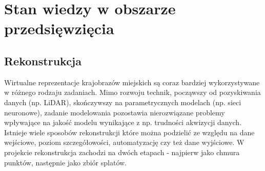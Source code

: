 \section{Stan wiedzy w obszarze przedsięwzięcia}



\subsection{Rekonstrukcja}

Wirtualne reprezentacje krajobrazów miejskich są coraz bardziej wykorzystywane w różnego rodzaju zadaniach. Mimo rozwoju technik, począwszy od pozyskiwania danych (np. LiDAR), skończywszy na parametrycznych modelach (np. sieci neuronowe), zadanie modelowania pozostawia nierozwiązane problemy wpływające na jakość modelu wynikające z np. trudności akwizycji danych. 
Istnieje wiele sposobów rekonstrukcji które można podzielić ze względu na dane wejściowe, poziom szczegółowości, automatyzację czy też dane wyjściowe. W projekcie rekonstrukcja zachodzi na dwóch etapach - najpierw jako chmura punktów, następnie jako zbiór splatów. 

